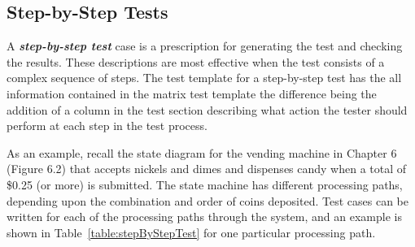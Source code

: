 \subsection*{Step-by-Step Tests}
\label{subsection:step-by-step-tests}

A \emph{\textbf{step-by-step test}} case is a prescription for
generating the test and checking the results. These descriptions are
most effective when the test consists of a complex sequence of steps.
The test template for a step-by-step test has the all information
contained in the matrix test template the difference being the addition
of a column in the test section describing what action the tester should
perform at each step in the test process.

As an example, recall the state diagram for the vending machine in
Chapter 6 (Figure 6.2) that accepts nickels and dimes and dispenses
candy when a total of \$0.25 (or more) is submitted. The state machine
has different processing paths, depending upon the combination and order
of coins deposited. Test cases can be written for each of the processing
paths through the system, and an example is shown in 
Table~\ref{table:stepByStepTest} for one
particular processing path.


